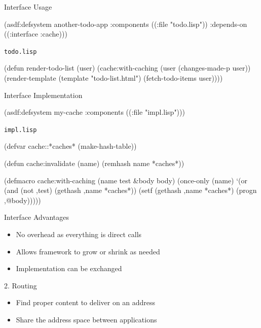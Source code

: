 \documentclass[14pt,t]{beamer}
\def\code#1{{\color{codecolor}\texttt{#1}}}
\renewcommand{\title}[1]{
  {\huge #1} \vskip 0.4cm
}
\begin{document}
\begin{frame}[fragile]
  \title{Interface Usage}
\begin{lispcode}
(asdf:defsystem another-todo-app
  :components ((:file "todo.lisp"))
  :depends-on ((:interface :cache)))
\end{lispcode}
  \pause
  \vskip 1cm
  {\footnotesize\code{todo.lisp}}
\begin{lispcode}
(defun render-todo-list (user)
  (cache:with-caching (user (changes-made-p user))
    (render-template (template "todo-list.html")
                     (fetch-todo-items user))))
\end{lispcode}
\end{frame}

\begin{frame}[fragile]
  \title{Interface Implementation}
\begin{lispcode}
(asdf:defsystem my-cache
  :components ((:file "impl.lisp")))
\end{lispcode}
  \vskip 1cm
  {\footnotesize\code{impl.lisp}}
\begin{lispcode}
(defvar cache::*caches* (make-hash-table))

(defun cache:invalidate (name)
  (remhash name *caches*))

(defmacro cache:with-caching (name test &body body)
  (once-only (name)
    `(or (and (not ,test) (gethash ,name *caches*))
         (setf (gethash ,name *caches*)
               (progn ,@body)))))
\end{lispcode}
\end{frame}

\begin{frame}
  \title{Interface Advantages}
  \begin{itemize}
  \item No overhead as everything is direct calls
  \item Allows framework to grow or shrink as needed
  \item Implementation can be exchanged
  \end{itemize}
\end{frame}

\begin{frame}
  \title{2. Routing}
  \begin{itemize}
  \item Find proper content to deliver on an address
  \item Share the address space between applications
  \end{itemize}
\end{frame}
\end{document}
